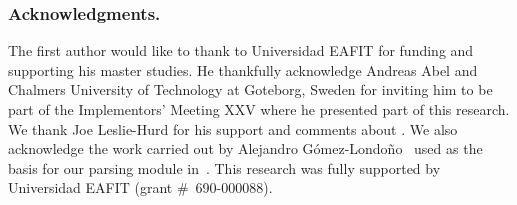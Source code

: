 \documentclass[../main.tex]{subfiles}
\begin{document}

\subsubsection*{Acknowledgments.}
The first author would like to thank to Universidad EAFIT for funding
and supporting his master studies. He thankfully acknowledge Andreas
Abel and Chalmers University of Technology at Goteborg, Sweden for
inviting him to be part of the \Agda Implementors’ Meeting XXV where
he presented part of this research. We thank Joe Leslie-Hurd for his
support and comments about \Metis.  We also acknowledge the work
carried out by Alejandro G\'omez-Londo\~no~\cite{Gomez-Londono2015}
used as the basis for our \TSTP parsing module in~\cite{Athena}. This
research was fully supported by Universidad EAFIT (grant
\#~690-000088).
\end{document}
